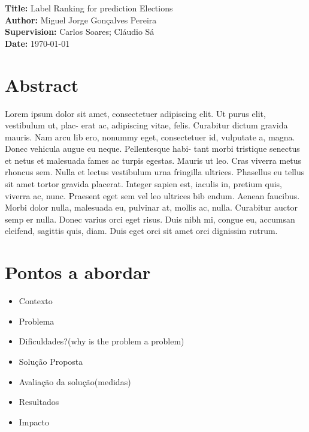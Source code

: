 \documentclass[11pt,a4paper]{article}
\newcommand{\titles}[2]{\noindent\textbf{#1:} #2\\[2mm]}
\begin{document}
\titles{Title}{Label Ranking for prediction Elections}
\titles{Author}{Miguel Jorge Gonçalves Pereira}
\titles{Supervision}{Carlos Soares; Cláudio Sá}
\titles{Date}{\today}

\section*{Abstract}

Lorem ipsum dolor sit amet, consectetuer adipiscing elit. Ut purus elit, vestibulum ut, plac- erat ac, adipiscing vitae, felis. Curabitur dictum gravida mauris. Nam arcu lib ero, nonummy eget, consectetuer id, vulputate a, magna. Donec vehicula augue eu neque. Pellentesque habi- tant morbi tristique senectus et netus et malesuada fames ac turpis egestas. Mauris ut leo. Cras viverra metus rhoncus sem. Nulla et lectus vestibulum urna fringilla ultrices. Phasellus eu tellus sit amet tortor gravida placerat. Integer sapien est, iaculis in, pretium quis, viverra ac, nunc. Praesent eget sem vel leo ultrices bib endum. Aenean faucibus. Morbi dolor nulla, malesuada eu, pulvinar at, mollis ac, nulla. Curabitur auctor semp er nulla. Donec varius orci eget risus. Duis nibh mi, congue eu, accumsan eleifend, sagittis quis, diam. Duis eget orci sit amet orci dignissim rutrum.

\section*{Pontos a abordar}

\begin{itemize}  
	\item Contexto
	\item Problema
	\item Dificuldades?(why is the problem a problem)
	\item Solução Proposta
	\item Avaliação da solução(medidas)
	\item Resultados
	\item Impacto
\end{itemize}

\nocite{*}  %



\end{document}
